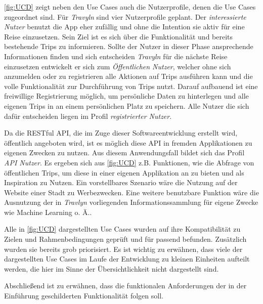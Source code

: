 \vspace{0.25cm}

\autoref{fig:UCD} zeigt neben den Use Cases auch die Nutzerprofile, denen die Use Cases zugeordnet sind. Für \textit{Travyln} sind vier Nutzerprofile geplant. Der \textit{interessierte Nutzer} benutzt die App eher zufällig und ohne die Intention sie aktiv für eine Reise einzusetzen. Sein Ziel ist es sich über die Funktionalität und bereits bestehende Trips zu informieren. Sollte der Nutzer in dieser Phase ansprechende Informationen finden und sich entscheiden \textit{Travyln} für die nächste Reise einzusetzen entwickelt er sich zum \textit{Öffentlichen Nutzer}, welcher ohne sich anzumelden oder zu registrieren alle Aktionen auf Trips ausführen kann und die volle Funktionalität zur Durchführung von Trips nutzt. Darauf aufbauend ist eine freiwillige Registrierung möglich, um persönliche Daten zu hinterlegen und alle eigenen Trips in an einem persönlichen Platz zu speichern. Alle Nutzer die sich dafür entscheiden liegen im Profil \textit{registrierter Nutzer}.

\vspace{0.25cm}

Da die RESTful API, die im Zuge dieser Softwareentwicklung erstellt wird, öffentlich angeboten wird, ist es möglich diese API in fremden Applikationen zu eigenen Zwecken zu nutzen. Aus diesem Anwendungsfall bildet sich das Profil \textit{API Nutzer}. Es ergeben sich aus \autoref{fig:UCD} z.B. Funktionen, wie die Abfrage von öffentlichen Trips, um diese in einer eigenen Applikation an zu bieten und als Inspiration zu Nutzen. Ein vorstellbares Szenario wäre die Nutzung auf der Website einer Stadt zu Werbezwecken. Eine weitere benutzbare Funktion wäre die Ausnutzung der in \textit{Travlyn} vorliegenden Informationssammlung für eigene Zwecke wie Machine Learning o. Ä.. 

\vspace{0.25cm}

 
Alle in \autoref{fig:UCD} dargestellten Use Cases wurden auf ihre Kompatibilität zu Zielen und Rahmenbedingungen geprüft und für passend befunden. Zusätzlich wurden sie bereits grob priorisiert. Es ist wichtig zu erwähnen, dass viele der dargestellten Use Cases im Laufe der Entwicklung zu kleinen Einheiten aufteilt werden, die hier im Sinne der Übersichtlichkeit nicht dargestellt sind.



Abschließend ist zu erwähnen, dass die funktionalen Anforderungen der in der Einführung geschilderten Funktionalität folgen soll.

